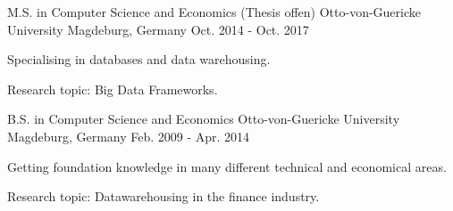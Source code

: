 

\begin{cventries}

     
   
   \cventry
    {M.S. in Computer Science and Economics (Thesis offen)} %
    {Otto-von-Guericke University} %
    {Magdeburg, Germany} %
    {Oct. 2014 - Oct. 2017} %
    {
      \begin{cvitems} %
          \item{Specialising in databases and data warehousing.}
          \item{Research topic: Big Data Frameworks.}
      \end{cvitems}
    }
    
   \cventry
    {B.S. in Computer Science and Economics} %
    {Otto-von-Guericke University} %
    {Magdeburg, Germany} %
    {Feb. 2009 - Apr. 2014} %
    {
      \begin{cvitems} %
          \item{Getting foundation knowledge in many different technical and economical areas.}
          \item{Research topic: Datawarehousing in the finance industry.}
      \end{cvitems}
    }
\end{cventries}
